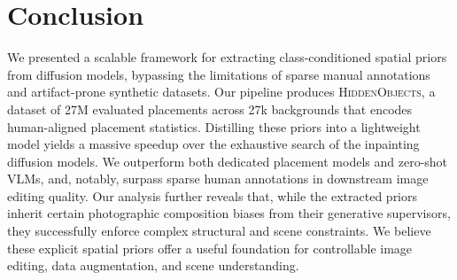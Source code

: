 \section{Conclusion}

We presented a scalable framework for extracting class-conditioned spatial priors from diffusion models, bypassing the limitations of sparse manual annotations and artifact-prone synthetic datasets. Our pipeline produces \textsc{HiddenObjects}, a dataset of 27M evaluated placements across 27k backgrounds that encodes human-aligned placement statistics. Distilling these priors into a lightweight model yields a massive speedup over the exhaustive search of the inpainting diffusion models. We outperform both dedicated placement models and zero-shot VLMs, and, notably, surpass sparse human annotations in downstream image editing quality. Our analysis further reveals that, while the extracted priors inherit certain photographic composition biases from their generative supervisors, they successfully enforce complex structural and scene constraints. We believe these explicit spatial priors offer a useful foundation for controllable image editing, data augmentation, and scene understanding.

